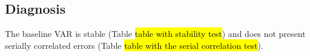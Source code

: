 \subsection{Diagnosis}
The baseline VAR is stable (Table \hl{table with stability test}) and does not present serially correlated errors (Table \hl{table with the serial correlation test}).
